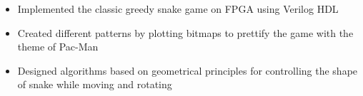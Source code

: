 \documentclass[12pt,a4paper,sans]{moderncv}   %
\begin{document}
{%
\begin{itemize}%
\item Implemented the classic greedy snake game on FPGA using Verilog HDL%
\item Created different patterns by plotting bitmaps to prettify the game with the theme of Pac-Man
\item Designed algorithms based on geometrical principles for controlling the shape of snake while moving and rotating
\end{itemize}
}



\renewcommand{\listitemsymbol}{-~}            %


\nocite{*}



\end{document}
